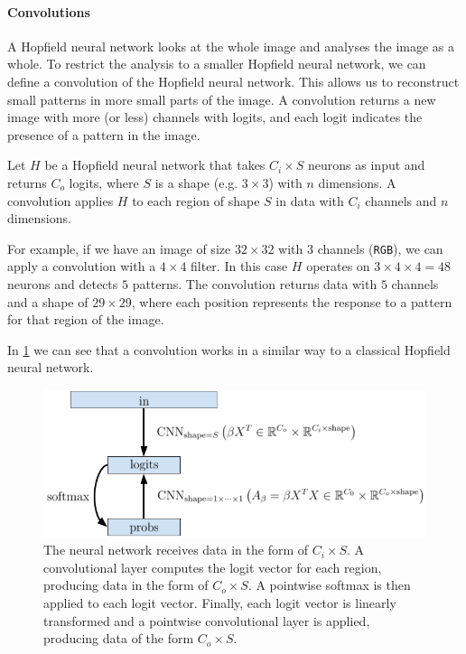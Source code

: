 \paragraph{Convolutions} A Hopfield neural network looks at the whole image and analyses the image as a whole. To restrict the analysis to a smaller Hopfield neural network, we can define a convolution of the Hopfield neural network. This allows us to reconstruct small patterns in more small parts of the image. A convolution returns a new image with more (or less) channels with logits, and each logit indicates the presence of a pattern in the image.

\noindent Let $H$ be a Hopfield neural network that takes $C_i \times S$ neurons as input and returns $C_o$ logits, where $S$ is a shape (e.g. $3 \times 3$) with $n$ dimensions. A convolution applies $H$ to each region of shape $S$ in data with $C_i$ channels and $n$ dimensions.

\noindent For example, if we have an image of size $32 \times 32$ with $3$ channels (\texttt{RGB}), we can apply a convolution with a $4 \times 4$ filter. In this case $H$ operates on $3 \times 4 \times 4 = 48$ neurons and detects $5$ patterns. The convolution returns data with $5$ channels and a shape of $29 \times 29$, where each position represents the response to a pattern for that region of the image.

\noindent In \cref{fig:CNN} we can see that a convolution works in a similar way to a classical Hopfield neural network.
\begin{figure}[htbp]
    \centering
    \includegraphics[width=0.8\linewidth]{Figures/CNN.png}
    \caption{The neural network receives data in the form of $C_i \times S$. A convolutional layer computes the logit vector for each region, producing data in the form of $C_o \times S$. A pointwise softmax is then applied to each logit vector. Finally, each logit vector is linearly transformed and a pointwise convolutional layer is applied, producing data of the form $C_o \times S$.}
    \label{fig:CNN}
\end{figure}

